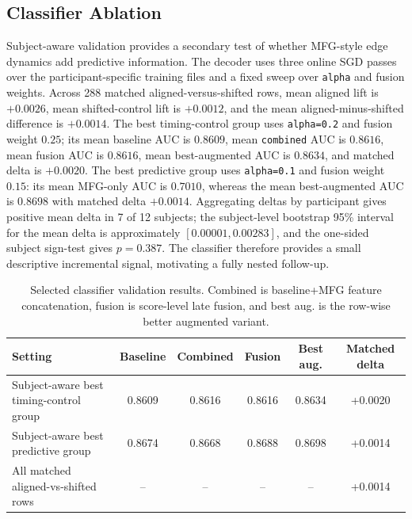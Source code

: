 \documentclass[10pt,journal]{IEEEtran}
\newcommand{\code}[1]{\texttt{#1}}
\begin{document}
\subsection{Classifier Ablation}
Subject-aware validation provides a secondary test of whether MFG-style edge dynamics add predictive information. The decoder uses three online SGD passes over the participant-specific training files and a fixed sweep over \code{alpha} and fusion weights. Across 288 matched aligned-versus-shifted rows, mean aligned lift is $+0.0026$, mean shifted-control lift is $+0.0012$, and the mean aligned-minus-shifted difference is $+0.0014$. The best timing-control group uses \code{alpha=0.2} and fusion weight $0.25$; its mean baseline AUC is $0.8609$, mean \code{combined} AUC is $0.8616$, mean fusion AUC is $0.8616$, mean best-augmented AUC is $0.8634$, and matched delta is $+0.0020$. The best predictive group uses \code{alpha=0.1} and fusion weight $0.15$: its mean MFG-only AUC is $0.7010$, whereas the mean best-augmented AUC is $0.8698$ with matched delta $+0.0014$. Aggregating deltas by participant gives positive mean delta in 7 of 12 subjects; the subject-level bootstrap 95\% interval for the mean delta is approximately $[0.00001, 0.00283]$, and the one-sided subject sign-test gives $p=0.387$. The classifier therefore provides a small descriptive incremental signal, motivating a fully nested follow-up.

\begin{table}[!t]
    \centering
    \caption{Selected classifier validation results. Combined is baseline+MFG feature concatenation, fusion is score-level late fusion, and best aug. is the row-wise better augmented variant.}
    \label{tab:classification}
    \footnotesize
    \begin{tabular}{p{}ccccc}
        \toprule
        Setting                             & Baseline & Combined & Fusion & Best aug. & Matched delta \\
        \midrule
        Subject-aware best timing-control group & 0.8609 & 0.8616 & 0.8616 & 0.8634 & +0.0020 \\
        Subject-aware best predictive group     & 0.8674 & 0.8668 & 0.8688 & 0.8698 & +0.0014 \\
        All matched aligned-vs-shifted rows     & --     & --     & --     & --     & +0.0014 \\
        \bottomrule
    \end{tabular}
\end{table}
\end{document}

